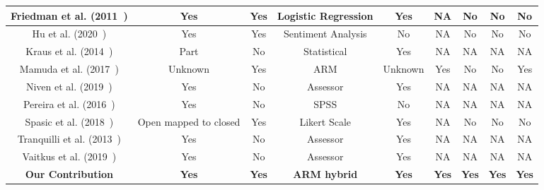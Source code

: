 \begin{landscape}
\begin{table}[htbp]
\begin{tabular}{|c|c|c|c|c|c|c|c|c|}
            \hline
            Friedman et al. (2011~\cite{friedman2012predicting})     & Yes                    & Yes               & Logistic Regression & Yes              & NA                  & No                 & No                & No                      \\
            \hline
            Hu et al. (2020~\cite{hu2020optimizing})                 & Yes                    & Yes               & Sentiment Analysis  & No               & NA                  & No                 & No                & No                      \\
            \hline
            Kraus et al. (2014~\cite{krause2014identifying})         & Part                   & No                & Statistical         & Yes              & NA                  & NA                 & NA                & NA                      \\
            \hline
            Mamuda et al. (2017~\cite{mamuda2017fusion})             & Unknown                & Yes               & ARM                 & Unknown          & Yes                 & No                 & No                & Yes                     \\
            \hline
            Niven et al. (2019~\cite{niven2019cigarette})            & Yes                    & No                & Assessor            & Yes              & NA                  & NA                 & NA                & NA                      \\
            \hline
            Pereira et al. (2016~\cite{pereira2016students})         & Yes                    & No                & SPSS                & No               & NA                  & NA                 & NA                & NA                      \\
            \hline
            Spasic et al. (2018~\cite{spasic2018closing})            & Open mapped to closed  & Yes               & Likert Scale        & Yes              & NA                  & No                 & No                & No                      \\
            \hline
            Tranquilli et al. (2013~\cite{tranquilli2013definition}) & Yes                    & No                & Assessor            & Yes              & NA                  & NA                 & NA                & NA                      \\
            \hline
            Vaitkus et al. (2019~\cite{vaitkus2019kamst})            & Yes                    & No                & Assessor            & Yes              & NA                  & NA                 & NA                & NA                      \\
            \hline
            \textbf{Our Contribution}                                & \textbf{Yes}           & \textbf{Yes}      & \textbf{ARM hybrid} & \textbf{Yes}     & \textbf{Yes}        & \textbf{Yes}       & \textbf{Yes}      & \textbf{Yes}            \\
            \hline
        \end{tabular}
    \end{table}
\end{landscape}
